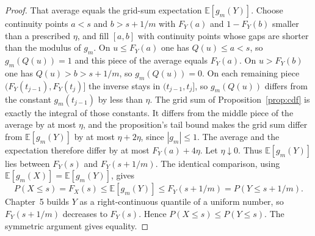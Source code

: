 \begin{proof}
That average equals the grid-sum expectation $\mathbb E[g_m(Y)]$. Choose continuity points $a<s$ and $b>s+1/m$ with $F_Y(a)$ and $1-F_Y(b)$ smaller than a prescribed $\eta$, and fill $[a,b]$ with continuity points whose gaps are shorter than the modulus of $g_m$. On $u\le F_Y(a)$ one has $Q(u)\le a<s$, so $g_m(Q(u))=1$ and this piece of the average equals $F_Y(a)$. On $u>F_Y(b)$ one has $Q(u)>b>s+1/m$, so $g_m(Q(u))=0$. On each remaining piece $(F_Y(t_{j-1}),F_Y(t_j)]$ the inverse stays in $(t_{j-1},t_j]$, so $g_m(Q(u))$ differs from the constant $g_m(t_{j-1})$ by less than $\eta$. The grid sum of Proposition~\ref{prop:cdf} is exactly the integral of those constants. It differs from the middle piece of the average by at most $\eta$, and the proposition's tail bound makes the grid sum differ from $\mathbb E[g_m(Y)]$ by at most $\eta+2\eta$, since $|g_m|\le1$. The average and the expectation therefore differ by at most $F_Y(a)+4\eta$. Let $\eta\downarrow0$. Thus $\mathbb E[g_m(Y)]$ lies between $F_Y(s)$ and $F_Y(s+1/m)$. The identical comparison, using $\mathbb E[g_m(X)]=\mathbb E[g_m(Y)]$, gives
\[
 P(X\le s)=F_X(s)\le\mathbb E[g_m(Y)]\le F_Y(s+1/m)=P(Y\le s+1/m).
\]
Chapter~5 builds $Y$ as a right-continuous quantile of a uniform number, so $F_Y(s+1/m)$ decreases to $F_Y(s)$. Hence $P(X\le s)\le P(Y\le s)$. The symmetric argument gives equality.


\end{proof}
